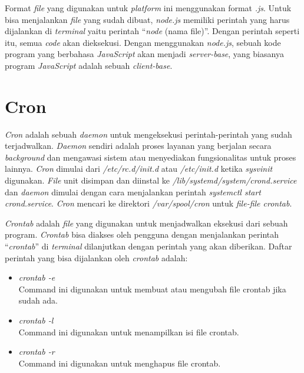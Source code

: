 Format \textit{file} yang digunakan untuk \textit{platform} ini menggunakan format \textit{.js}. Untuk bisa menjalankan \textit{file} yang sudah dibuat, \textit{node.js} memiliki perintah yang harus dijalankan di \textit{terminal} yaitu perintah ``\textit{node} (nama file)''. Dengan perintah seperti itu, semua \textit{code} akan dieksekusi. Dengan menggunakan \textit{node.js}, sebuah kode program yang berbahasa \textit{JavaScript} akan menjadi \textit{server-base}, yang biasanya program \textit{JavaScript} adalah sebuah \textit{client-base}. 

\section{Cron}
\label{sec:cron}
\textit{Cron} adalah sebuah \textit{daemon} untuk mengeksekusi perintah-perintah yang sudah terjadwalkan. \textit{Daemon} sendiri adalah proses layanan yang berjalan secara \textit{background} dan mengawasi sistem atau menyediakan fungsionalitas untuk proses lainnya. \textit{Cron} dimulai dari \textit{/etc/rc.d/init.d} atau \textit{/etc/init.d} ketika \textit{sysvinit} digunakan. \textit{File} unit disimpan dan diinstal ke \textit{/lib/systemd/system/crond.service} dan \textit{daemon} dimulai dengan cara menjalankan perintah \textit{systemctl start crond.service}. \textit{Cron} mencari ke direktori \textit{/var/spool/cron} untuk \textit{file-file crontab}. 

\textit{Crontab} adalah \textit{file} yang digunakan untuk menjadwalkan eksekusi dari sebuah program. \textit{Crontab} bisa diakses oleh pengguna dengan menjalankan perintah ``\textit{crontab}'' di \textit{terminal} dilanjutkan dengan perintah yang akan diberikan. Daftar perintah yang bisa dijalankan oleh \textit{crontab} adalah:
\begin{itemize}
	\item \textit{crontab -e}\\
	Command ini digunakan untuk membuat atau mengubah file crontab jika sudah ada. 
	\item \textit{crontab -l}\\
	Command ini digunakan untuk menampilkan isi file crontab.
	\item \textit{crontab -r}\\
	Command ini digunakan untuk menghapus file crontab.
\end{itemize}

